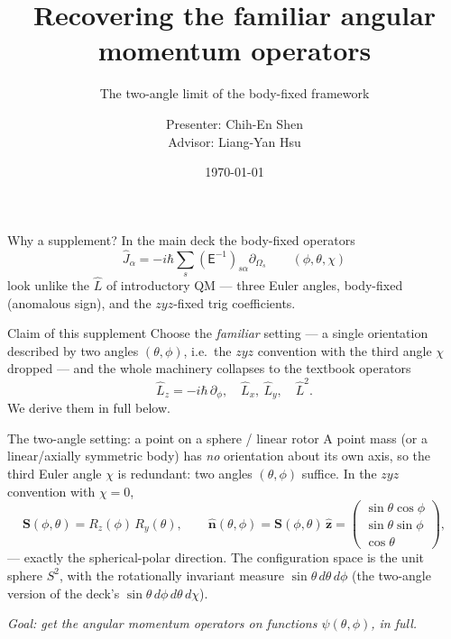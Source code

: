 \documentclass[aspectratio=169,10pt]{beamer}
\title{Recovering the familiar angular momentum operators}
\subtitle{The two-angle limit of the body-fixed framework}
\author{Presenter: Chih-En Shen \\ Advisor: Liang-Yan Hsu}
\date{\today}
\begin{document}
\maketitle

\begin{frame}{Why a supplement?}
In the main deck the body-fixed operators
\begin{equation*}
\hat J_\alpha=-i\hbar\sum_s(\mathsf E^{-1})_{s\alpha}\partial_{\Omega_s}\qquad(\phi,\theta,\chi)\tag{4.24}
\end{equation*}
look unlike the $\hat L$ of introductory QM --- three Euler angles, body-fixed (anomalous sign), and the $zyz$-fixed trig coefficients.
\begin{block}{Claim of this supplement}
Choose the \emph{familiar} setting --- a single orientation described by \alert{two} angles $(\theta,\phi)$, i.e.\ the $zyz$ convention with the third angle $\chi$ dropped --- and the whole machinery collapses to the textbook operators
\[
\hat L_z=-i\hbar\,\partial_\phi,\quad \hat L_x,\ \hat L_y,\quad \hat L^2 .
\]
We derive them in full below.
\end{block}
\end{frame}

\begin{frame}{The two-angle setting: a point on a sphere / linear rotor}
A point mass (or a linear/axially symmetric body) has \emph{no} orientation about its own axis, so the third Euler angle $\chi$ is redundant: two angles $(\theta,\phi)$ suffice. In the $zyz$ convention with $\chi=0$,
\begin{equation*}
\mathbf S(\phi,\theta)=R_z(\phi)\,R_y(\theta),\qquad
\hat{\mathbf n}(\theta,\phi)=\mathbf S(\phi,\theta)\,\hat{\mathbf z}
=\begin{pmatrix}\sin\theta\cos\phi\\ \sin\theta\sin\phi\\ \cos\theta\end{pmatrix},
\end{equation*}
--- exactly the spherical-polar direction. The configuration space is the unit sphere $S^2$, with the rotationally invariant measure $\sin\theta\,d\theta\,d\phi$ (the two-angle version of the deck's $\sin\theta\,d\phi\,d\theta\,d\chi$).
\begin{center}
\itshape Goal: get the angular momentum operators on functions $\psi(\theta,\phi)$, in full.
\end{center}
\end{frame}
\end{document}
